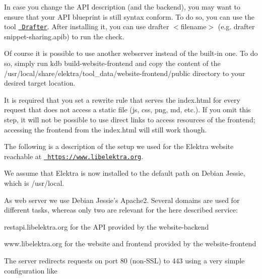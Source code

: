 In case you change the A\+PI description (and the backend), you may want to ensure that your A\+PI blueprint is still syntax conform. To do so, you can use the tool \href{https://github.com/apiaryio/drafter}{\texttt{ Drafter}}. After installing it, you can use {\ttfamily drafter $<$filename$>$} (e.\+g. {\ttfamily drafter snippet-\/sharing.\+apib}) to run the check.

Of course it is possible to use another webserver instead of the built-\/in one. To do so, simply run {\ttfamily kdb build-\/website-\/frontend} and copy the content of the {\ttfamily /usr/local/share/elektra/tool\+\_\+data/website-\/frontend/public} directory to your desired target location.

It is required that you set a rewrite rule that serves the {\ttfamily index.\+html} for every request that does not access a static file ({\ttfamily js}, {\ttfamily css}, {\ttfamily png}, {\ttfamily md}, etc.). If you omit this step, it will not be possible to use direct links to access resources of the frontend; accessing the frontend from the {\ttfamily index.\+html} will still work though.

The following is a description of the setup we used for the Elektra website reachable at \href{https://www.libelektra.org}{\texttt{ https\+://www.\+libelektra.\+org}}.

We assume that Elektra is now installed to the default path on Debian Jessie, which is {\ttfamily /usr/local}.

As web server we use Debian Jessie’s Apache2. Several domains are used for different tasks, whereas only two are relevant for the here described service\+:


\begin{DoxyItemize}
\item {\ttfamily restapi.\+libelektra.\+org} for the A\+PI provided by the {\ttfamily website-\/backend}
\item {\ttfamily www.\+libelektra.\+org} for the website and frontend provided by the {\ttfamily website-\/frontend}
\end{DoxyItemize}

The server redirects requests on port 80 (non-\/\+S\+SL) to 443 using a very simple configuration like


\begin{DoxyCode}{0}
\end{DoxyCode}


